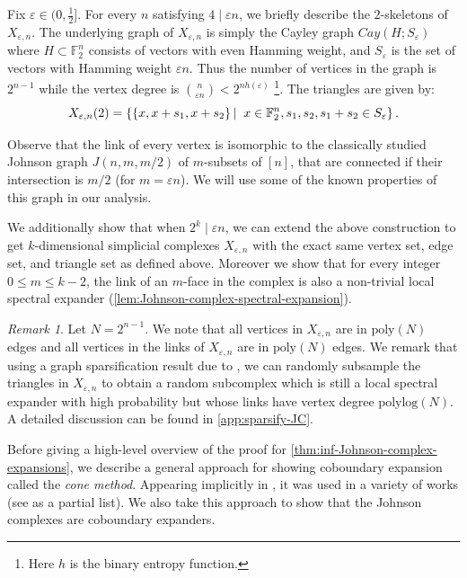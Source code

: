 \documentclass[10pt,a4paper]{article}
\newcommand{\prettyref}[1]{\cref{#1}}
\theoremstyle{definition}
\theoremstyle{remark}
\newtheorem{remark}[theorem]{Remark}
\newcommand\sett[2]{\left\{ #1 \left| \; \vphantom{#1 #2} \right. #2  \right\}}
\newcommand{\F}{\mathbb{F}}
\renewcommand{\le}{\leqslant}
\numberwithin{equation}{section}
\let\pref=\prettyref
\begin{document}
 Fix $\varepsilon \in (0,\frac{1}{2}]$. For every $n$ satisfying $4\;|\;\varepsilon n$, we briefly describe the $2$-skeletons of $X_{\varepsilon,n}$. The underlying graph of $X_{\varepsilon,n}$ is simply the Cayley graph $Cay(H; S_\varepsilon)$ where $H\subset \F_2^n$ consists of vectors with even Hamming weight, and $S_\varepsilon$ is the set of vectors with Hamming weight $\varepsilon n$. Thus the number of vertices in the graph is $2^{n-1}$ while the vertex degree is $\binom{n}{\varepsilon n} < 2^{nh(\varepsilon)}$ \footnote{Here $h$ is the binary entropy function.}. The triangles are given by:
\[X_{\varepsilon,n}(2) = \sett{ \{x, x+s_1, x+s_2\} }{x\in \F_2^n, s_1,s_2, s_1+s_2 \in S_\varepsilon}.\]

Observe that the link of every vertex is isomorphic to the classically studied Johnson graph \(J(n,m,m/2)\) of \(m\)-subsets of \([n]\), that are connected if their intersection is \(m/2\) (for \(m=\varepsilon n\)). We will use some of the known properties of this graph in our analysis.

We additionally show that when $2^k \;|\; \varepsilon n$, we can extend the above construction to get $k$-dimensional simplicial complexes $X_{\varepsilon,n}$ with the exact same vertex set, edge set, and triangle set as defined above. Moreover we show that for every integer $0\le m \le k-2$, the link of an $m$-face in the complex is also a non-trivial local spectral expander (\pref{lem:Johnson-complex-spectral-expansion}).

\begin{remark}
    Let $N = 2^{n-1}$.
    We note that all vertices in $X_{\varepsilon,n}$ are in $\mathrm{poly}(N)$ edges and all vertices in the links of $X_{\varepsilon, n}$ are in $\mathrm{poly}(N)$ edges. 
    We remark that using a graph sparsification result due to \cite{ChungH07}, we can randomly subsample the triangles in $X_{\varepsilon,n}$ to obtain a random subcomplex which is still a local spectral expander with high probability but whose links have vertex degree $\mathrm{polylog}(N)$. A detailed discussion can be found in \pref{app:sparsify-JC}.
\end{remark}

Before giving a high-level overview of the proof for \pref{thm:inf-Johnson-complex-expansions}, we describe a general approach for showing coboundary expansion called the \emph{cone method}. Appearing implicitly in \cite{Gromov2010}, it was used in a variety of works (see \cite{LubotzkyMM2016,KozlovM2019,KaufmanO2021} as a partial list). We also take this approach to show that the Johnson complexes are coboundary expanders.
\end{document}

